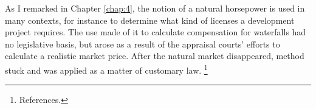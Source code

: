 As I remarked in Chapter \ref{chap:4}, the notion of a natural horsepower is  used in many contexts, for instance to determine what kind of licenses a development project requires. The use made of it to calculate compensation for waterfalls had no legislative basis, but arose as a result of the appraisal courts' efforts to calculate a realistic market price. After the natural market disappeared, method stuck and was applied as a matter of customary law.
%
%
%
\footnote{References.}

